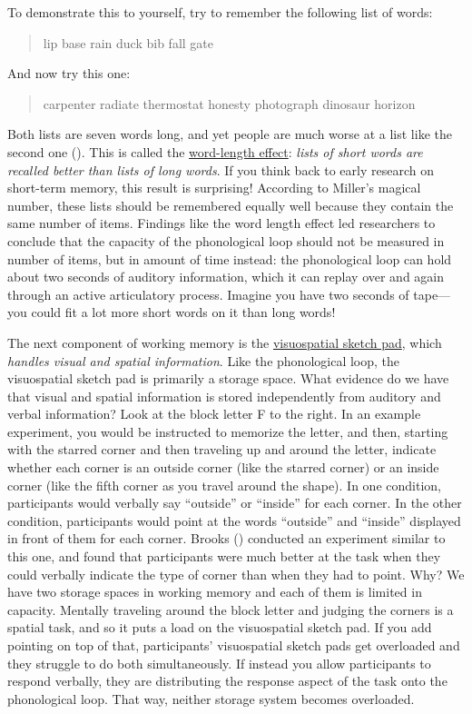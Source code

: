 \documentclass[
]{krantz}
\begin{document}
To demonstrate this to yourself, try to remember the following list of words:

\begin{quote}
lip base rain duck bib fall gate
\end{quote}

And now try this one:

\begin{quote}
carpenter radiate thermostat honesty photograph dinosaur horizon
\end{quote}

Both lists are seven words long, and yet people are much worse at a list like the second one (). This is called the \hyperref[word-length-effect]{word-length effect}: \emph{lists of short words are recalled better than lists of long words}. If you think back to early research on short-term memory, this result is surprising! According to Miller's magical number, these lists should be remembered equally well because they contain the same number of items. Findings like the word length effect led researchers to conclude that the capacity of the phonological loop should not be measured in number of items, but in amount of time instead: the phonological loop can hold about two seconds of auditory information, which it can replay over and again through an active articulatory process. Imagine you have two seconds of tape--- you could fit a lot more short words on it than long words!

The next component of working memory is the \hyperref[visuospatial-sketch-pad]{visuospatial sketch pad}, which \emph{handles visual and spatial information}. Like the phonological loop, the visuospatial sketch pad is primarily a storage space. What evidence do we have that visual and spatial information is stored independently from auditory and verbal information? Look at the block letter F to the right. In an example experiment, you would be instructed to memorize the letter, and then, starting with the starred corner and then traveling up and around the letter, indicate whether each corner is an outside corner (like the starred corner) or an inside corner (like the fifth corner as you travel around the shape). In one condition, participants would verbally say ``outside'' or ``inside'' for each corner. In the other condition, participants would point at the words ``outside'' and ``inside'' displayed in front of them for each corner. Brooks () conducted an experiment similar to this one, and found that participants were much better at the task when they could verbally indicate the type of corner than when they had to point. Why? We have two storage spaces in working memory and each of them is limited in capacity. Mentally traveling around the block letter and judging the corners is a spatial task, and so it puts a load on the visuospatial sketch pad. If you add pointing on top of that, participants' visuospatial sketch pads get overloaded and they struggle to do both simultaneously. If instead you allow participants to respond verbally, they are distributing the response aspect of the task onto the phonological loop. That way, neither storage system becomes overloaded.
\end{document}

